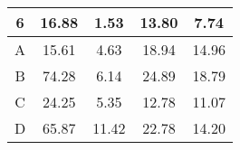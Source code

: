 \begin{table}[]
\begin{tabular}{|c|c|c|c|c|}
6                                                                                       & 16.88                                                                                      & 1.53                                                                                                  & 13.80                                                                                                    & 7.74                                                                                                      \\ \hline
A                                                                                       & 15.61                                                                                      & 4.63                                                                                                  & 18.94                                                                                                    & 14.96                                                                                                     \\ \hline
B                                                                                       & 74.28                                                                                      & 6.14                                                                                                  & 24.89                                                                                                    & 18.79                                                                                                     \\ \hline
C                                                                                       & 24.25                                                                                      & 5.35                                                                                                  & 12.78                                                                                                    & 11.07                                                                                                     \\ \hline
D                                                                                       & 65.87                                                                                      & 11.42                                                                                                 & 22.78                                                                                                    & 14.20                                                                                                     \\ \hline

\end{tabular}
\end{table}
